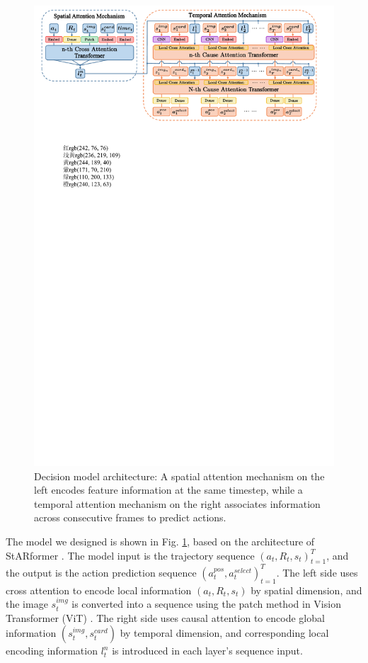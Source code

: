 \documentclass[runningheads]{llncs}
\begin{document}
\begin{figure}[htbp]
  \centering
  \includegraphics[width=\textwidth]{figures/policy_model.pdf}
  \caption{Decision model architecture: A spatial attention mechanism on the left encodes feature information
  at the same timestep, while a temporal attention mechanism on the right associates information across consecutive
  frames to predict actions.
  }\label{fig-policy-model}
\end{figure}

\noindent The model we designed is shown in Fig. \ref{fig-policy-model},
based on the architecture of StARformer \cite{StARformer}.
The model input is the trajectory sequence $(a_t, R_t, s_t)_{t=1}^T$,
and the output is the action prediction sequence $(a_t^{pos}, a_t^{select})_{t=1}^T$.
The left side uses cross attention to encode local information $(a_t, R_t, s_t)$ by spatial dimension,
and the image $s_t^{img}$ is converted into a sequence using the patch method in Vision Transformer (ViT) \cite{ViT}.
The right side uses causal attention to encode global information $(s^{img}_t, s^{card}_t)$ by temporal dimension,
and corresponding local encoding information $l_t^n$ is introduced in each layer's sequence input.
\end{document}
